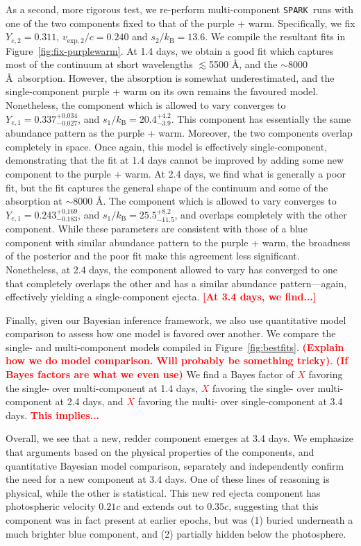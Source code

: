\documentclass[twocolumn,twocolappendix]{aastex63}
\def\SPARK{\texttt{SPARK}}
\newcommand\redbf[1]{\textbf{\textcolor{red}{#1}}}
\begin{document}
As a second, more rigorous test, we re-perform multi-component \SPARK~runs with one of the two components fixed to that of the purple + warm. Specifically, we fix $Y_{e,2} = 0.311$, $v_{\mathrm{exp},2}/c = 0.240$ and $s_2 / k_{\mathrm{B}} = 13.6$. We compile the resultant fits in Figure~\ref{fig:fix-purplewarm}. At 1.4 days, we obtain a good fit which captures most of the continuum at short wavelengths $\lesssim$5500 \AA, and the $\sim$8000 \AA~absorption. However, the absorption is somewhat underestimated, and the single-component purple + warm on its own remains the favoured model. Nonetheless, the component which is allowed to vary converges to $Y_{e,1} = 0.337^{+0.034}_{-0.027}$, and $s_1 / k_{\mathrm{B}} = 20.4^{+4.2}_{-3.9}$. This component has essentially the same abundance pattern as the purple + warm. Moreover, the two components overlap completely in space. Once again, this model is effectively single-component, demonstrating that the fit at 1.4 days cannot be improved by adding some new component to the purple + warm. At 2.4 days, we find what is generally a poor fit, but the fit captures the general shape of the continuum and some of the absorption at $\sim$8000 \AA. The component which is allowed to vary converges to $Y_{e,1} = 0.243^{+0.169}_{-0.183}$, and $s_1 / k_{\mathrm{B}} = 25.5^{+8.2}_{-11.5}$, and overlaps completely with the other component. While these parameters are consistent with those of a blue component with similar abundance pattern to the purple + warm, the broadness of the posterior and the poor fit make this agreement less significant. Nonetheless, at 2.4 days, the component allowed to vary has converged to one that completely overlaps the other and has a similar abundance pattern---again, effectively yielding a single-component ejecta. \redbf{[At 3.4 days, we find...]} 

Finally, given our Bayesian inference framework, we also use quantitative model comparison to assess how one model is favored over another. We compare the single- and multi-component models compiled in Figure~\ref{fig:bestfits}. \redbf{(Explain how we do model comparison. Will probably be something tricky)}. \redbf{(If Bayes factors are what we even use)} We find a Bayes factor  of \redbf{$X$} favoring the single- over multi-component at 1.4 days, \redbf{$X$} favoring the single- over multi-component at 2.4 days, and \redbf{$X$} favoring the multi- over single-component at 3.4 days. \redbf{This implies...}

Overall, we see that a new, redder component emerges at 3.4 days. We emphasize that arguments based on the physical properties of the components, and quantitative Bayesian model comparison, separately and independently confirm the need for a new component at 3.4 days. One of these lines of reasoning is physical, while the other is statistical. This new red ejecta component has photospheric velocity $0.21c$ and extends out to $0.35c$, suggesting that this component was in fact present at earlier epochs, but was (1) buried underneath a much brighter blue component, and (2) partially hidden below the photosphere. 
\end{document}
